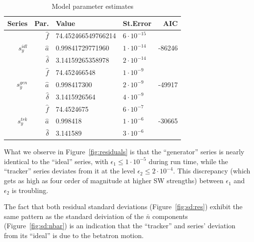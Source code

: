 \documentclass[a4paper]{jacow}
\newcommand{\nbar}{\bar n}
\begin{document}
\begin{table}[h]
  \caption{Model parameter estimates\label{tbl:param_estimates}}
  \begin{tabular}{r|rllr}
    \toprule
    Series & Par. & Value & St.Error & AIC \\
    \midrule
    \multirow{3}{*}{$s_y^{idl}$} & $\hat f$ & 74.452466549766214 & $6\cdot10^{-15}$ & \multirow{3}{*}{-86246} \\
    & $\hat a$ & 0.99841729771960 & $1\cdot10^{-14}$ & \\
    & $\hat\delta$ & 3.14159265358978 & $2\cdot 10^{-14}$ &\\
    \hline
    \multirow{3}{*}{$s_y^{gen}$} & $\hat f$ & 74.452466548 & $1\cdot 10^{-9}$ & \multirow{3}{*}{-49917} \\
    & $\hat a$ & 0.998417300 & $2\cdot 10^{-9}$ & \\
    & $\hat\delta$ & 3.1415926564 & $4\cdot 10^{-9}$ &\\
    \hline
    \multirow{3}{*}{$s_y^{trk}$} & $\hat f$ & 74.4524675 & $6\cdot 10^{-7}$ & \multirow{3}{*}{-30665} \\
    & $\hat a$ & 0.998418 & $1\cdot10^{-6}$ & \\
    & $\hat\delta$ & 3.141589 & $3\cdot 10^{-6}$ &\\
    \bottomrule
  \end{tabular}
\end{table}

What we observe in Figure~\ref{fig:residuals} is that the ``generator'' series is nearly identical
to the ``ideal'' series, with $\epsilon_1 \le 1\cdot10^{-5}$ during run time,
while the ``tracker'' series deviates from it at the level
$\epsilon_2 \le 2\cdot 10^{-4}$. This discrepancy (which gets as high as
four order of magnitude at higher SW strengths) between $\epsilon_1$ and $\epsilon_2$ is troubling.

The fact that both residual standard deviations (Figure~\ref{fig:sd:res}) exhibit the same pattern as
the standard deiviation of the $\nbar$ components (Figure~\ref{fig:sd:nbar}) is an indication that the
``tracker'' and series' deviation from its ``ideal'' is due to the betatron motion.
\end{document}
